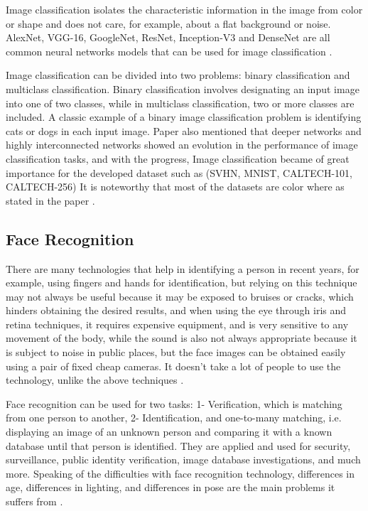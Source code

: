 \documentclass[12pt,twocolumn,a4paper]{article}
\begin{document}
    Image classification isolates the characteristic information in the image from color or shape and does not care, for example, about a flat background or noise.  AlexNet, VGG-16, GoogleNet, ResNet, Inception-V3 and DenseNet are all common neural networks models that can be used for image classification \cite{Gowda2019-rd}.

    Image classification can be divided into two problems: binary classification and multiclass classification.  Binary classification involves designating an input image into one of two classes, while in multiclass classification, two or more classes are included.  A classic example of a binary image classification problem is identifying cats or dogs in each input image.  Paper \cite{Gowda2019-rd} also mentioned that deeper networks and highly interconnected networks showed an evolution in the performance of image classification tasks, and with the progress, Image classification became of great importance for the developed dataset such as (SVHN, MNIST, CALTECH-101, CALTECH-256) It is noteworthy that most of the datasets are color where as stated in the paper \cite{Gowda2019-rd} . 
     
    \subsection{Face Recognition}
    \hspace{0.3cm} There are many technologies that help in identifying a person in recent years, for example, using fingers and hands for identification, but relying on this technique may not always be useful because it may be exposed to bruises or cracks, which hinders obtaining the desired results, and when using the eye through iris and retina techniques, it requires expensive equipment, and is very sensitive to any movement of the body, while the sound is also not always appropriate because it is subject to noise in public places, but the face images can be obtained easily using a pair of fixed cheap cameras. It doesn't take a lot of people to use the technology, unlike the above techniques \cite{10.3745/JIPS.2009.5.2.041}.

    Face recognition can be used for two tasks: 1- Verification, which is matching from one person to another, 2- Identification, and one-to-many matching, i.e. displaying an image of an unknown person and comparing it with a known database until that person is identified. They are applied and used for security, surveillance, public identity verification, image database investigations, and much more. Speaking of the difficulties with face recognition technology, differences in age, differences in lighting, and differences in pose are the main problems it suffers from \cite{10.3745/JIPS.2009.5.2.041}.
\end{document}
